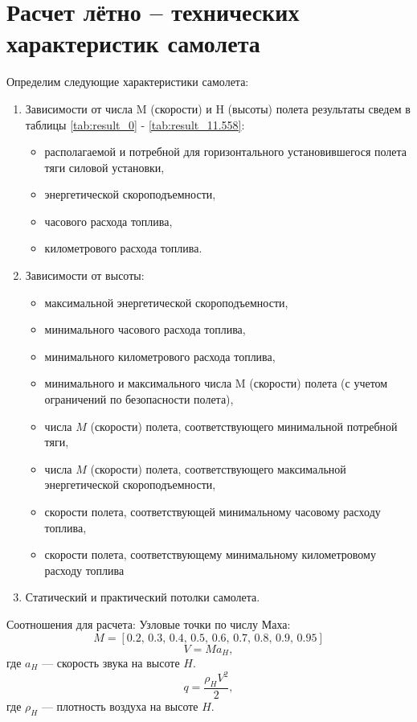 \section{Расчет лётно – технических характеристик самолета}\label{sec:flight_param}

Определим следующие характеристики самолета:
\begin{enumerate}
    \item Зависимости от числа M (скорости) и H (высоты) полета результаты
        сведем в таблицы \ref{tab:result_0} - \ref{tab:result_11.558}:
    \begin{itemize}
    \item  располагаемой и потребной для горизонтального установившегося полета
    тяги силовой установки, 
    \item энергетической скороподъемности,
    \item часового расхода топлива,
    \item километрового расхода топлива.
    \end{itemize}
    \item Зависимости от высоты:
        \begin{itemize}
            \item максимальной энергетической скороподъемности,
            \item минимального часового расхода топлива,
            \item минимального километрового расхода топлива,
            \item минимального и максимального числа M (скорости) полета (с учетом
                ограничений по безопасности полета),
            \item числа $M$ (скорости) полета, соответствующего минимальной
                потребной тяги,
            \item числа $M$ (скорости) полета, соответствующего максимальной
                энергетической скороподъемности,
            \item скорости полета, соответствующей минимальному часовому расходу топлива,
            \item скорости полета, соответствующему минимальному километровому
                расходу топлива
        \end{itemize}
    \item Статический и практический потолки самолета.
\end{enumerate}

Соотношения для расчета:
Узловые точки по числу Маха:
\[
    M = [0.2,\,0.3,\,0.4,\,0.5,\,0.6,\,0.7,\,0.8,\,0.9,\,0.95]
\]
\begin{equation}
    V = M a_H,
    \label{eq:V_speed}
\end{equation}
где $a_H$ --- скорость звука на высоте $H$.
\begin{equation}
    q = \frac{\rho_H V^2}{2},
    \label{eq:q_value}
\end{equation}
где $\rho_H$ --- плотность воздуха на высоте $H$.

